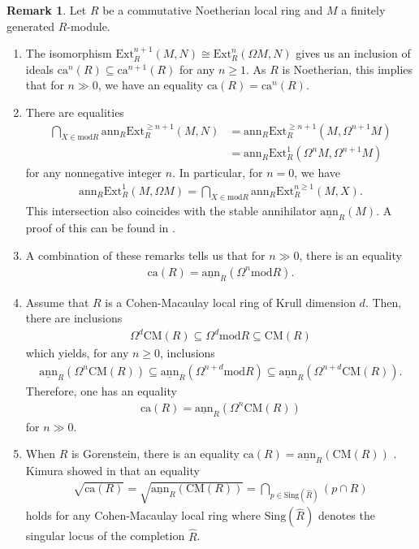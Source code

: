\documentclass[12pt]{amsart}
\newcommand{\Ext}{\mathrm{Ext}}
\newcommand{\ann}{\mathrm{ann}}
\newcommand{\sann}{\underline{\mathrm{ann}}}
\newcommand\ca{\mathrm{ca}}
\newcommand{\module}{\mathrm{mod}}
\newcommand{\CM}{\mathrm{CM}}
\newcommand{\sing}{\mathrm{Sing}}
\theoremstyle{definition}
\newtheorem{remark}[theorem]{Remark}
\numberwithin{equation}{theorem}
\begin{document}
\begin{remark}\label{cohomology-annihilator-remarks}
    Let $R$ be a commutative Noetherian local ring and $M$ a finitely generated $R$-module.
    \begin{enumerate}
        \item The isomorphism $\Ext_R^{n+1}(M,N) \cong \Ext_R^n(\Omega M, N)$ gives us an inclusion of ideals $\ca^n(R) \subseteq \ca^{n+1}(R)$ for any $n \geq 1$. As $R$ is Noetherian, this implies that for $n \gg 0$, we have an equality $\ca(R) = \ca^n(R)$.  
        \item There are equalities 
        \begin{align*}
        \bigcap_{X \in \module R} \ann_R \Ext_R^{\geq n+1}(M,N) &= \ann_R\Ext_R^{\geq n+1}(M, \Omega^{n+1}M) \\
        &= \ann_R\Ext_R^1(\Omega^n M, \Omega^{n+1}M)
        \end{align*}
        for any nonnegative integer $n$. In particular, for $n = 0$, we have
        \begin{align*}
        \ann_R \Ext_R^1(M, \Omega M) = \bigcap_{X \in \module R} \ann_R \Ext_R^{n \geq 1}(M,X).
        \end{align*}
        This intersection also coincides with the stable annihilator $\sann_R(M)$. A proof of this can be found in \cite[Section 2]{iyengar-takahashi}.
        \item A combination of these remarks tells us that for $n \gg 0$, there is an equality 
        \begin{align*}
        \ca(R) = \sann_R(\Omega^n \module R).
        \end{align*}
        \item Assume that $R$ is a Cohen-Macaulay local ring of Krull dimension $d$. Then, there are inclusions 
        \begin{align*}
        \Omega^d \CM(R) \subseteq \Omega^d \module R \subseteq \CM(R)
        \end{align*}
        which yields, for any $n \geq 0$, inclusions 
        \begin{align*}
        \sann_R(\Omega^{n} \CM(R)) \subseteq \sann_R(\Omega^{n+d}\module R) \subseteq \sann_R(\Omega^{n+d} \CM(R)).
        \end{align*}
        Therefore, one has an equality 
        \begin{align*}
        \ca(R) = \sann_R(\Omega^n \CM(R))
        \end{align*}
        for $n \gg 0$.
        \item When $R$ is Gorenstein, there is an equality $\ca(R) = \sann_R(\CM(R))$ \cite[Lemma 2.3]{Esentepe}. Kimura showed in \cite[Theorem 1.1]{Kimura} that an equality 
        \begin{align*}
        \sqrt{\ca(R)} = \sqrt{\sann_R(\CM(R))} = \bigcap_{p \in \sing(\hat{R})} (p \cap R)
        \end{align*}
        holds for any Cohen-Macaulay local ring where $\sing(\hat{R})$ denotes the singular locus of the completion $\hat{R}$.
    \end{enumerate}
\end{remark}
\end{document}
